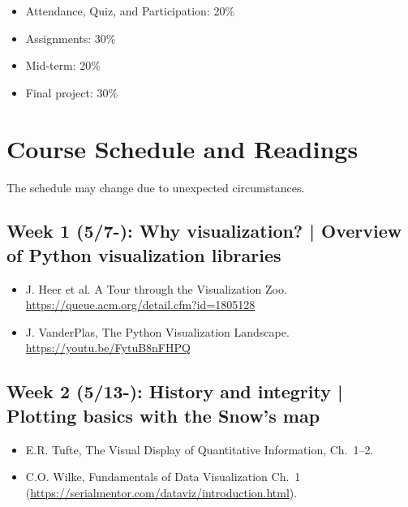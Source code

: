\documentclass[11pt,article,oneside]{memoir} %
\begin{document}
\begin{itemize}%

\item Attendance, Quiz, and Participation: 20\%

\item Assignments: 30\%

\item Mid-term: 20\%

\item Final project: 30\%

\end{itemize}%
\section{Course Schedule and Readings}%

The schedule may change due to unexpected circumstances. 

\subsection{Week 1 (5/7-): Why visualization? | Overview of Python visualization libraries} %

\begin{itemize}\itemsep0em 
\item J. Heer et al. A Tour through the Visualization Zoo. \url{https://queue.acm.org/detail.cfm?id=1805128}
\item J. VanderPlas, The Python Visualization Landscape. \url{https://youtu.be/FytuB8nFHPQ}
\end{itemize}	
\subsection{Week 2 (5/13-): History and integrity | Plotting basics with the Snow's map }%

\begin{itemize}\itemsep0em 
\item E.R. Tufte, The Visual Display of Quantitative Information, Ch.~1--2.
\item C.O. Wilke, Fundamentals of Data Visualization Ch.~1 (\url{https://serialmentor.com/dataviz/introduction.html}). 
\end{itemize}	

\end{document}
